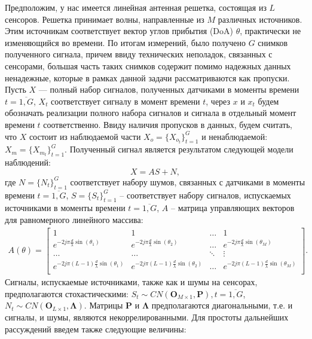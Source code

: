\documentclass[11pt]{article}
\begin{document}
\begin{center}
\fontsize{20}{23}\selectfont {}
\end{center}
\begin{center}
\fontsize{16}{20}\selectfont {}
\end{center}
Предположим, у нас имеется линейная антенная решетка, состоящая из $L$ сенсоров. Решетка принимает волны, направленные из $M$ различных источников. Этим источникам соответствует вектор углов прибытия (DoA) $\theta$, практически не изменяющийся во времени. По итогам измерений, было получено $G$ снимков полученного сигнала, причем ввиду технических неполадок, связанных с сенсорами, большая часть таких снимков содержит помимо надежных данных ненадежные, которые в рамках данной задачи рассматриваются как пропуски. Пусть $X$ --- полный набор сигналов, полученных датчиками в моменты времени $t=\overline{1,G}$, $X_t$ соответствует сигналу в момент времени $t$, через $x$ и $x_t$ будем обозначать реализации полного набора сигналов и сигнала в отдельный момент времени $t$  соответственно. Ввиду наличия пропусков в данных, будем считать, что $X$ состоит из наблюдаемой части $X_o = \{X_{o_t}\}_{t=1}^G$ и ненаблюдаемой: $X_m = \{X_{m_t}\}_{t=1}^G$. Полученный сигнал является результатом следующей модели наблюдений:
\begin{equation}
X = A S + N,
\end{equation}
где $N=\{N_t\}_{t=1}^G$ соответствует набору шумов, связанных с датчиками в моменты времени $t=\overline{1,G}$, $S=\{S_t\}_{t=1}^G$ -- соответствует набору сигналов, испускаемых источниками в моменты времени $t=\overline{1,G}$, $A$ -- матрица управляющих векторов для равномерного линейного массива:
\begin{gather}
A(\theta) = \begin{bmatrix}
1&1&\dots&1\\
e^{-2j\pi \frac{d}{\lambda}\sin(\theta_1)}& e^{-2j\pi \frac{d}{\lambda}\sin(\theta_2)}&\dots&e^{-2j\pi \frac{d}{\lambda}\sin(\theta_M)}\\
\dots&\dots&\ddots&\vdots\\
e^{-2j\pi (L-1) \frac{d}{\lambda}\sin(\theta_1)}& e^{-2j\pi (L-1) \frac{d}{\lambda}\sin(\theta_2)}&\dots&e^{-2j\pi (L-1) \frac{d}{\lambda}\sin(\theta_M)}\\
\end{bmatrix}.
\nonumber
\end{gather}
Сигналы, испускаемые источниками, также как и шумы на сенсорах, предполагаются стохастическими: $S_t \sim CN(\mathbf{O}_{M \times 1},\mathbf{P}),t=\overline{1,G}$, $N_t \sim CN(\mathbf{O}_{L \times 1}, \mathbf{\Lambda})$. Матрицы $\mathbf{P}$ и $\mathbf{\Lambda}$ предполагаются диагональными, т.е. и сигналы, и шумы, являются некоррелированными. Для простоты дальнейших рассуждений введем также следующие величины:
\end{document}
